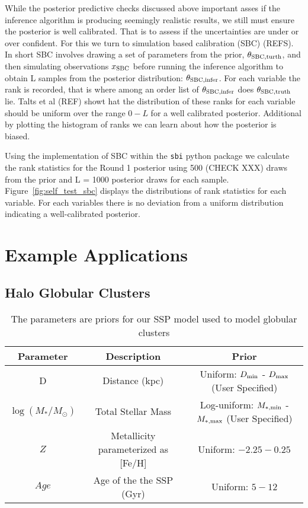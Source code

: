 \documentclass[twocolumn]{aastex631}
\begin{document}
While the posterior predictive checks discussed above important asses if the inference algorithm is producing seemingly realistic results, we still must ensure the posterior is well calibrated. That is to assess if the uncertainties are under or over confident. For this we turn to simulation based calibration (SBC) (REFS). In short SBC involves drawing a set of parameters from the prior, $\theta_{\rm SBC, turth}$, and then simulating observations $x_{\rm SBC}$ before running the inference algorithm to obtain L samples from the posterior distribution: $\theta_{\rm SBC, infer}$. For each variable the rank is recorded, that is where among an order list of $\theta_{\rm SBC, infer}$ does $\theta_{\rm SBC, truth}$ lie. Talts et al (REF) showt hat the distribution of these ranks for each variable should be uniform over the range $0 - L$ for a well calibrated posterior. Additional by plotting the histogram of ranks we can learn about how the posterior is biased.

Using the implementation of SBC within the \texttt{sbi} python package we calculate the rank statistics for the Round 1 posterior using 500 (CHECK XXX) draws from the prior and L = 1000 posterior draws for each sample. Figure~\ref{fig:self_test_sbc} displays the distributions of rank statistics for each variable. For each variables there is no deviation from a uniform distribution indicating a well-calibrated posterior.

\section{Example Applications}
\subsection{Halo Globular Clusters}
\label{sec:gc}
\begin{table*}
    \centering
    \caption{The parameters are priors for our SSP model used to model globular clusters}
    \small
    \begin{tabular}{c c c} 
        Parameter & Description & Prior \\  \hline \hline
         D & Distance (kpc) & Uniform: $D_{\rm min}$ -  $D_{\rm max}$ (User Specified) \\
         $\log (M_*/M_\odot)$ & Total Stellar Mass & Log-uniform: $M_{\rm*, min}$ -  $M_{\rm* , max}$ (User Specified) \\
         $Z$ & Metallicity parameterized as [Fe/H] & Uniform: $-2.25-0.25$ \\
         $Age$& Age of the the SSP (Gyr) & Uniform: $5-12$\\ \hline
    \end{tabular}
    \label{tab:ssp_model}
\end{table*}
\end{document}
